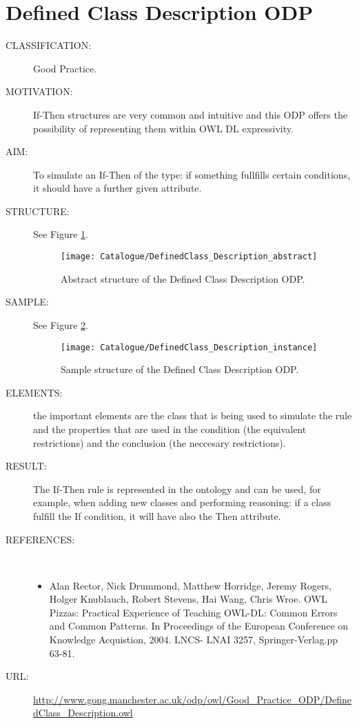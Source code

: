  \section{Defined Class Description ODP}\begin{description}
\item [CLASSIFICATION:] Good Practice.

\item [MOTIVATION:] If-Then structures are very common and intuitive and this ODP offers the possibility of representing them within OWL DL expressivity.

\item [AIM:] To simulate an If-Then of the type: if something fullfills certain conditions, it should have a further given attribute.

\item [STRUCTURE:] See Figure \ref{odp:DefinedClass_Description_abstract}.
\begin{figure}[]\centering\texttt{[image: Catalogue/DefinedClass\_Description\_abstract]}\caption{\label{odp:DefinedClass_Description_abstract} Abstract structure of the Defined Class Description ODP.}\end{figure}

\item [SAMPLE:] See Figure \ref{odp:DefinedClass_Description_instance}.
\begin{figure}[]\centering\texttt{[image: Catalogue/DefinedClass\_Description\_instance]}\caption{\label{odp:DefinedClass_Description_instance} Sample structure of the Defined Class Description ODP.}\end{figure}

\item [ELEMENTS:] the important elements are the class that is being used to simulate the rule and the properties that are used in the condition (the equivalent restrictions) and the conclusion (the neccesary restrictions).

\item [RESULT:] The If-Then rule is represented in the ontology and can be used, for example, when adding new classes and performing reasoning: if a class fulfill the If condition, it will have also the Then attribute.

\item [REFERENCES: ] ~\begin{itemize}
\item Alan Rector, Nick Drummond, Matthew Horridge, Jeremy Rogers, Holger Knublauch,  Robert Stevens, Hai Wang, Chris Wroe. OWL Pizzas: Practical Experience of Teaching OWL-DL: Common Errors and Common Patterns. In Proceedings of  the European Conference on Knowledge Acquistion, 2004. LNCS- LNAI 3257, Springer-Verlag.pp 63-81.\end{itemize}
\item [URL: ] \url{http://www.gong.manchester.ac.uk/odp/owl/Good_Practice_ODP/DefinedClass_Description.owl} \end{description}
